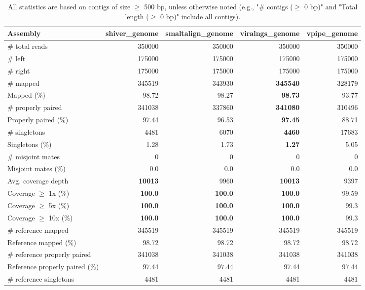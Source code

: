 \documentclass[12pt,a4paper]{article}
\begin{document}
\begin{table}[ht]
\begin{center}
\caption{All statistics are based on contigs of size $\geq$ 500 bp, unless otherwise noted (e.g., "\# contigs ($\geq$ 0 bp)" and "Total length ($\geq$ 0 bp)" include all contigs).}
\begin{tabular}{|l*{4}{|r}|}
\hline
Assembly & shiver\_genome & smaltalign\_genome & viralngs\_genome & vpipe\_genome \\ \hline
\# total reads & 350000 & 350000 & 350000 & 350000 \\ \hline
\# left & 175000 & 175000 & 175000 & 175000 \\ \hline
\# right & 175000 & 175000 & 175000 & 175000 \\ \hline
\# mapped & 345519 & 343930 & {\bf 345540} & 328179 \\ \hline
Mapped (\%) & 98.72 & 98.27 & {\bf 98.73} & 93.77 \\ \hline
\# properly paired & 341038 & 337860 & {\bf 341080} & 310496 \\ \hline
Properly paired (\%) & 97.44 & 96.53 & {\bf 97.45} & 88.71 \\ \hline
\# singletons & 4481 & 6070 & {\bf 4460} & 17683 \\ \hline
Singletons (\%) & 1.28 & 1.73 & {\bf 1.27} & 5.05 \\ \hline
\# misjoint mates & 0 & 0 & 0 & 0 \\ \hline
Misjoint mates (\%) & 0.0 & 0.0 & 0.0 & 0.0 \\ \hline
Avg. coverage depth & {\bf 10013} & 9960 & {\bf 10013} & 9397 \\ \hline
Coverage $\geq$ 1x (\%) & {\bf 100.0} & {\bf 100.0} & {\bf 100.0} & 99.59 \\ \hline
Coverage $\geq$ 5x (\%) & {\bf 100.0} & {\bf 100.0} & {\bf 100.0} & 99.3 \\ \hline
Coverage $\geq$ 10x (\%) & {\bf 100.0} & {\bf 100.0} & {\bf 100.0} & 99.3 \\ \hline
\# reference mapped & 345519 & 345519 & 345519 & 345519 \\ \hline
Reference mapped (\%) & 98.72 & 98.72 & 98.72 & 98.72 \\ \hline
\# reference properly paired & 341038 & 341038 & 341038 & 341038 \\ \hline
Reference properly paired (\%) & 97.44 & 97.44 & 97.44 & 97.44 \\ \hline
\# reference singletons & 4481 & 4481 & 4481 & 4481 \\ \hline

\end{tabular}
\end{center}
\end{table}
\end{document}
